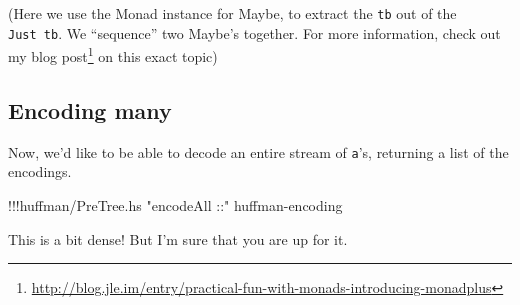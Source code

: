 \documentclass[]{article}
\newenvironment{Shaded}{}{}
\newcommand{\StringTok}[1]{\textcolor[rgb]{0.25,0.44,0.63}{{#1}}}
\newcommand{\FunctionTok}[1]{\textcolor[rgb]{0.02,0.16,0.49}{{#1}}}
\newcommand{\NormalTok}[1]{{#1}}
\renewcommand{\href}[2]{#2\footnote{\url{#1}}}
\begin{document}
(Here we use the Monad instance for Maybe, to extract the
\texttt{tb\textquotesingle{}} out of the \texttt{Just\ tb}. We
``sequence'' two Maybe's together. For more information, check out my
\href{http://blog.jle.im/entry/practical-fun-with-monads-introducing-monadplus}{blog
post} on this exact topic)

\subsection{Encoding many}\label{encoding-many}

Now, we'd like to be able to decode an entire stream of \texttt{a}'s,
returning a list of the encodings.

\begin{Shaded}
\begin{Highlighting}[]
\FunctionTok{!!!}\NormalTok{huffman}\FunctionTok{/}\NormalTok{PreTree.hs }\StringTok{"encodeAll ::"} \NormalTok{huffman}\FunctionTok{-}\NormalTok{encoding}
\end{Highlighting}
\end{Shaded}

This is a bit dense! But I'm sure that you are up for it.
\end{document}
